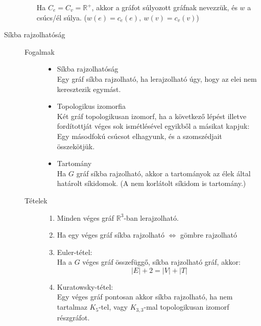 \documentclass[margin=0px]{article}
\newcommand{\R}{\mathbb{R}}
\begin{document}
\begin{description}
\begin{itemize}
                  Ha $C_e = C_v = \R^+$, akkor a gráfot súlyozott gráfnak nevezzük, és $w$ a csúcs/él súlya. (${w(e)=c_e(e)},\ {w(v) = c_v(v)}$)
        \end{itemize}
    \item[Síkba rajzolhatóság] \hfill
        \begin{description}
            \item[Fogalmak] \hfill
                \begin{itemize}
                    \item Síkba rajzolhatóság \\
                          Egy gráf síkba rajzolható, ha lerajzolható úgy, hogy az elei nem keresztezik egymást.
                    \item Topologikus izomorfia \\
                          Két gráf topologikusan izomorf, ha a következő lépést illetve fordítottját véges sok ismétlésével egyikből a másikat kapjuk: Egy másodfokú csúcsot elhagyunk, és a szomszédjait összekötjük.
                    \item Tartomány \\
                          Ha $G$ gráf síkba rajzolható, akkor a tartományok az élek által határolt síkidomok. (A nem korlátolt síkidom is tartomány.)
                \end{itemize}
            \item[Tételek] \hfill
                \begin{enumerate}
                    \item Minden véges gráf $\R^3$-ban lerajzolható.
                    \item Ha egy véges gráf síkba rajzolható $\Longleftrightarrow$ gömbre rajzolható
                    \item Euler-tétel: \\
                          Ha a $G$ véges gráf összefüggő, síkba rajzolható gráf, akkor:
                          \[|E|+2 = |V|+|T|\]
                    \item Kuratowsky-tétel: \\
                          Egy véges gráf pontosan akkor síkba rajzolható, ha nem tartalmaz $K_5$-tel, vagy $K_{3,3}$-mal topologikusan izomorf részgráfot.
                \end{enumerate}
        \end{description}
\end{description}
\end{document}
